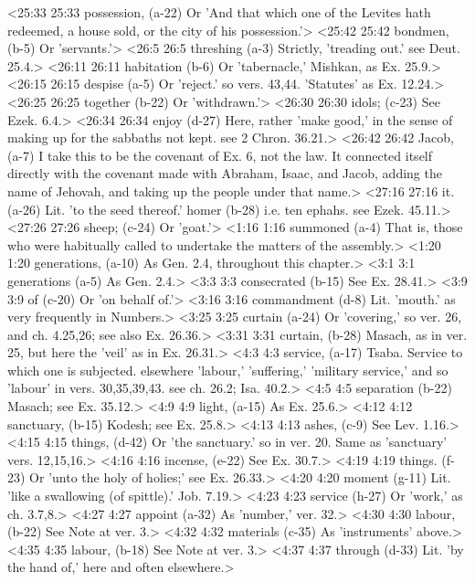 <25:33 25:33  possession, (a-22)  Or 'And that which one of the Levites hath redeemed, a house  sold, or the city of his possession.'>
<25:42 25:42  bondmen, (b-5)  Or 'servants.'>
<26:5 26:5  threshing (a-3)  Strictly, 'treading out.' see Deut. 25.4.>
<26:11 26:11  habitation (b-6)  Or 'tabernacle,' Mishkan, as Ex. 25.9.>
<26:15 26:15  despise (a-5)  Or 'reject.' so vers. 43,44. 'Statutes' as Ex. 12.24.>
<26:25 26:25  together (b-22)  Or 'withdrawn.'>
<26:30 26:30  idols; (c-23)  See Ezek. 6.4.>
<26:34 26:34  enjoy (d-27)  Here, rather 'make good,' in the sense of making up for the  sabbaths not kept. see 2 Chron. 36.21.>
<26:42 26:42  Jacob, (a-7)  I take this to be the covenant of Ex. 6, not the law. It  connected itself directly with the covenant made with Abraham,  Isaac, and Jacob, adding the name of Jehovah, and taking up the  people under that name.>
<27:16 27:16  it. (a-26)  Lit. 'to the seed thereof.'
  homer (b-28)  i.e. ten ephahs. see Ezek. 45.11.>
<27:26 27:26  sheep; (c-24)  Or 'goat.'>
<1:16 1:16  summoned (a-4)  That is, those who were habitually called to undertake the  matters of the assembly.>
<1:20 1:20  generations, (a-10)  As Gen. 2.4, throughout this chapter.>
<3:1 3:1  generations (a-5)  As Gen. 2.4.>
<3:3 3:3  consecrated (b-15)  See Ex. 28.41.>
<3:9 3:9  of (c-20)  Or 'on behalf of.'>
<3:16 3:16  commandment (d-8)  Lit. 'mouth.' as very frequently in Numbers.>
<3:25 3:25  curtain (a-24)  Or 'covering,' so ver. 26, and ch. 4.25,26; see also Ex.  26.36.>
<3:31 3:31  curtain, (b-28)  Masach, as in ver. 25, but here the 'veil' as in Ex. 26.31.>
<4:3 4:3  service, (a-17)  Tsaba. Service to which one is subjected. elsewhere  'labour,' 'suffering,' 'military service,' and so 'labour' in  vers. 30,35,39,43. see ch. 26.2; Isa. 40.2.>
<4:5 4:5  separation (b-22)  Masach; see Ex. 35.12.>
<4:9 4:9  light, (a-15)  As Ex. 25.6.>
<4:12 4:12  sanctuary, (b-15)  Kodesh; see Ex. 25.8.>
<4:13 4:13  ashes, (c-9)  See Lev. 1.16.>
<4:15 4:15  things, (d-42)  Or 'the sanctuary.' so in ver. 20. Same as 'sanctuary' vers. 12,15,16.>
<4:16 4:16  incense, (e-22)  See Ex. 30.7.>
<4:19 4:19  things. (f-23)  Or 'unto the holy of holies;' see Ex. 26.33.>
<4:20 4:20  moment (g-11)  Lit. 'like a swallowing (of spittle).' Job. 7.19.>
<4:23 4:23  service (h-27)  Or 'work,' as ch. 3.7,8.>
<4:27 4:27  appoint (a-32)  As 'number,' ver. 32.>
<4:30 4:30  labour, (b-22) See Note at ver. 3.>
<4:32 4:32  materials (c-35)  As 'instruments' above.>
<4:35 4:35  labour, (b-18) See Note at ver. 3.>
<4:37 4:37  through (d-33)  Lit. 'by the hand of,' here and often elsewhere.>
